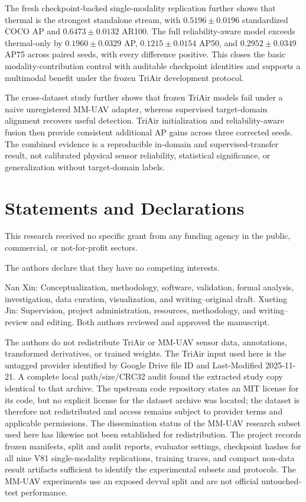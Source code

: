 The fresh checkpoint-backed single-modality replication further shows that thermal is the strongest standalone stream, with $0.5196\pm0.0196$ standardized COCO AP and $0.6473\pm0.0132$ AR100. The full reliability-aware model exceeds thermal-only by $0.1960\pm0.0329$ AP, $0.1215\pm0.0154$ AP50, and $0.2952\pm0.0349$ AP75 across paired seeds, with every difference positive. This closes the basic modality-contribution control with auditable checkpoint identities and supports a multimodal benefit under the frozen TriAir development protocol.

The cross-dataset study further shows that frozen TriAir models fail under a naive unregistered MM-UAV adapter, whereas supervised target-domain alignment recovers useful detection. TriAir initialization and reliability-aware fusion then provide consistent additional AP gains across three corrected seeds. The combined evidence is a reproducible in-domain and supervised-transfer result, not calibrated physical sensor reliability, statistical significance, or generalization without target-domain labels.

\section*{Statements and Declarations}
This research received no specific grant from any funding agency in the public, commercial, or not-for-profit sectors.

The authors declare that they have no competing interests.

Nan Xin: Conceptualization, methodology, software, validation, formal analysis, investigation, data curation, visualization, and writing--original draft. Xueting Jin: Supervision, project administration, resources, methodology, and writing--review and editing. Both authors reviewed and approved the manuscript.

The authors do not redistribute TriAir or MM-UAV sensor data, annotations, transformed derivatives, or trained weights. The TriAir input used here is the untagged provider  identified by Google Drive file ID  and Last-Modified 2025-11-21. A complete local path/size/CRC32 audit found the extracted study copy identical to that archive. The upstream code repository states an MIT license for its code, but no explicit license for the dataset archive was located; the dataset is therefore not redistributed and access remains subject to provider terms and applicable permissions. The dissemination status of the MM-UAV research subset used here has likewise not been established for redistribution. The project records frozen manifests, split and audit reports, evaluator settings, checkpoint hashes for all nine V81 single-modality replications, training traces, and compact non-data result artifacts sufficient to identify the experimental subsets and protocols. The MM-UAV experiments use an exposed devval split and are not official untouched-test performance.

